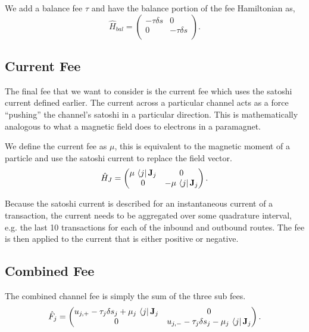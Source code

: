 \documentclass[review,12pt]{elsarticle}
\begin{document}
We add a balance fee $\tau$ and have the balance portion of the fee Hamiltonian as,
\begin{equation}
  \hat{H}_{bal} = \begin{pmatrix}
    -\tau \delta s & 0              \\
    0              & -\tau \delta s \\
  \end{pmatrix}. \nonumber
\end{equation}

\subsection{Current Fee}
The final fee that we want to consider is the current fee which uses the satoshi current defined earlier.
The current across a particular channel acts as a force ``pushing'' the channel's satoshi in a particular direction.
This is mathematically analogous to what a magnetic field does to electrons in a paramagnet.

We define the current fee as $\mu$, this is equivalent to the magnetic moment of a particle and use the satoshi current to replace the field vector.
\begin{equation}
  \hat{H}_{J} = \begin{pmatrix}
    \mu \,\Bra{j}\mathbf{J}_j & 0                          \\
    0                         & -\mu \,\Bra{j}\mathbf{J}_j \\
  \end{pmatrix}. \nonumber
\end{equation}

Because the satoshi current is described for an instantaneous current of a transaction, the current needs to be aggregated over some quadrature interval, e.g. the last 10 transactions for each of the inbound and outbound routes.
The fee is then applied to the current that is either positive or negative.

\subsection{Combined Fee}
The combined channel fee is simply the sum of the three sub fees.
\begin{equation}
  \hat{F}_j = \begin{pmatrix}
    u_{j,+} -\tau_j \delta s_j + \mu_j \,\Bra{j}\mathbf{J}_j & 0                                                         \\
    0                                                        & u_{j,-} -\tau_j \delta s_j -  \mu_j \,\Bra{j}\mathbf{J}_j \\
  \end{pmatrix}. \label{eq:2}
\end{equation}
\end{document}
